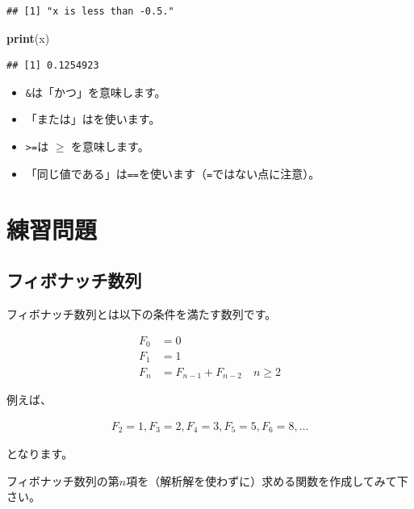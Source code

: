 \documentclass[]{bxjsreport}
\newenvironment{Shaded}{\begin{snugshade}}{\end{snugshade}}
\newcommand{\KeywordTok}[1]{\textcolor[rgb]{0.13,0.29,0.53}{\textbf{#1}}}
\newcommand{\NormalTok}[1]{#1}
\providecommand{\tightlist}{%
  \setlength{\itemsep}{0pt}\setlength{\parskip}{0pt}}
\let\asdf\section
\renewcommand{\section}{\chapter}
\let\asdff\subsection
\renewcommand{\subsection}{\asdf}
\renewcommand{\subsubsection}{\asdff}
\begin{document}
\begin{verbatim}
## [1] "x is less than -0.5."
\end{verbatim}

\begin{Shaded}
\begin{Highlighting}[]
\KeywordTok{print}\NormalTok{(x)}
\end{Highlighting}
\end{Shaded}

\begin{verbatim}
## [1] 0.1254923
\end{verbatim}

\begin{itemize}
\tightlist
\item
  \texttt{\&}は「かつ」を意味します。
\item
  「または」は\texttt{\textbar{}}を使います。
\item
  \texttt{\textgreater{}=}は \(\geq\) を意味します。
\item
  「同じ値である」は\texttt{==}を使います（\texttt{=}ではない点に注意）。
\end{itemize}

\hypertarget{ux7df4ux7fd2ux554fux984c}{%
\subsection{練習問題}\label{ux7df4ux7fd2ux554fux984c}}

\hypertarget{ux30d5ux30a3ux30dcux30caux30c3ux30c1ux6570ux5217}{%
\subsubsection{フィボナッチ数列}\label{ux30d5ux30a3ux30dcux30caux30c3ux30c1ux6570ux5217}}

フィボナッチ数列とは以下の条件を満たす数列です。

\[
\begin{aligned}
  F_0 &= 0 \\
  F_1 &= 1 \\
  F_{n} &= F_{n-1} + F_{n-2} \quad n \geq 2
\end{aligned}
\]

例えば、

\[
\begin{aligned}
  F_2 = 1, F_3 = 2, F_4 = 3, F_5 = 5, F_6 = 8,\ldots
\end{aligned}
\]

となります。

フィボナッチ数列の第\(n\)項を（解析解を使わずに）求める関数を作成してみて下さい。
\end{document}
